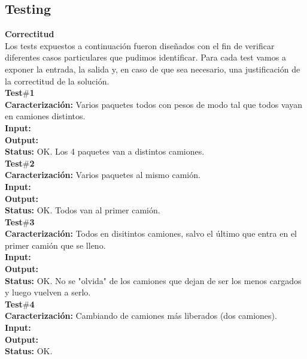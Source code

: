 \newpage
\subsection{Testing}
\textbf{Correctitud}\\

Los tests expuestos a continuación fueron diseñados con el fin de verificar diferentes casos particulares que pudimos identificar. Para cada test vamos a exponer la entrada, la salida y, en caso de que sea necesario, una justificaci\'on de la correctitud de la soluci\'on.\\

\noindent\textbf{Test$\#$1}\\
\textbf{Caracterización:} Varios paquetes todos con pesos de modo tal que todos vayan en camiones distintos.\\
\textbf{Input:} \\
\textbf{Output:} \\
\textbf{Status:} OK. Los 4 paquetes van a distintos camiones.\\

\noindent\textbf{Test$\#$2}\\
\textbf{Caracterización:} Varios paquetes al mismo camión.\\
\textbf{Input:} \\
\textbf{Output:} \\
\textbf{Status:} OK. Todos van al primer camión.\\

\noindent\textbf{Test$\#$3}\\
\textbf{Caracterización:} Todos en disitintos camiones, salvo el \'ultimo que entra en el primer camión que se lleno.\\
\textbf{Input:} \\
\textbf{Output:} \\
\textbf{Status:} OK. No se "olvida" de los camiones que dejan de ser los menos cargados y luego vuelven a serlo.\\

\noindent\textbf{Test$\#$4}\\
\textbf{Caracterización:} Cambiando de camiones m\'as liberados (dos camiones).\\
\textbf{Input:} \\
\textbf{Output:} \\
\textbf{Status:} OK. \\

